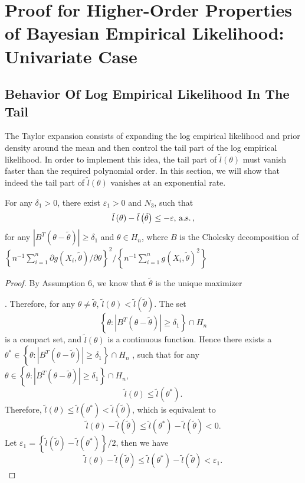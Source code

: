 \chapter{Proof for Higher-Order Properties of Bayesian Empirical Likelihood:
Univariate Case}

\section{Behavior Of Log Empirical Likelihood In  The Tail}

The Taylor expansion consists of  expanding the log empirical
likelihood and prior density around the mean and  then control
the tail part of the log empirical likelihood. In order to implement
this idea, the tail part of $\tilde{l}\left(\theta\right)$ must vanish
faster than the required polynomial order. In this section,
we will show that indeed the tail part of $\tilde{l}\left(\theta\right)$
vanishes at an exponential rate.
\begin{lemma}
\label{lemma:exponential-decay-tail-2} For any $\delta_{1}>0$, there
exist $\varepsilon_{1}>0$ and $N_{3}$, such that 
\[
\tilde{l}\left(\theta\right)-\tilde{l}\left(\tilde{\theta}\right)\le-\varepsilon,\,\mathrm{a.s.}\,,
\]
for any $\left|B^T\left(\theta-\tilde{\theta}\right)\right|\ge\delta_{1}$
and $\theta\in H_n$, 
where $B$ is the Cholesky decomposition of
 $\left\{ n^{-1}\sum_{i=1}^{n}\partial g\left(X_{i},\tilde{\theta}\right)/\partial\theta\right\} ^{2}/\left\{ n^{-1}\sum_{i=1}^{n}g\left(X_{i},\tilde{\theta}\right)^{2}\right\} $
 \end{lemma}
\begin{proof}
By Assumption 6, we know that $\tilde{\theta}$ is the unique maximizer%

. Therefore, for any $\theta\neq\tilde{\theta}$, $\tilde{l}\left(\theta\right)<\tilde{l}\left(\tilde{\theta}\right)$.
The set 
\[
\left\{ \theta:\left|B^T\left(\theta-\tilde{\theta}\right)\right|\ge\delta_{1}\right\} \cap H_n
\]
is a compact set, and $\tilde{l}\left(\theta\right)$ is a continuous
function. Hence there exists a $\theta^{*}\in\left\{ \theta:\left|B^T\left(\theta-\tilde{\theta}\right)\right|\ge\delta_{1}\right\} \cap H_n$
, such that for any $\theta\in\left\{ \theta:\left|B^T\left(\theta-\tilde{\theta}\right)\right|\ge\delta_{1}\right\} \cap H_n$,
\[
\tilde{l}\left(\theta\right)\le\tilde{l}\left(\theta^{*}\right).
\]
Therefore, $\tilde{l}\left(\theta\right)\le\tilde{l}\left(\theta^{*}\right)<\tilde{l}\left(\tilde{\theta}\right)$, which is equivalent to 
\[
\tilde{l}\left(\theta\right)-\tilde{l}\left(\tilde{\theta}\right)\le\tilde{l}\left(\theta^{*}\right)-\tilde{l}\left(\tilde{\theta}\right)<0.
\]
Let $\varepsilon_{1}=\left\{ \tilde{l}\left(\tilde{\theta}\right)-\tilde{l}\left(\theta^{*}\right)\right\} /2$,
then we have 
\[
\tilde{l}\left(\theta\right)-\tilde{l}\left(\tilde{\theta}\right)\le\tilde{l}\left(\theta^{*}\right)-\tilde{l}\left(\tilde{\theta}\right)<\varepsilon_{1}.
\]

\end{proof}

